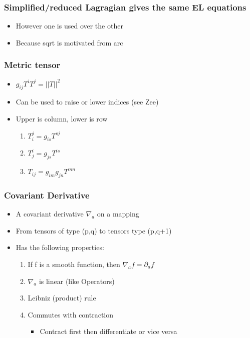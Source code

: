 \documentclass[11pt]{article}
\begin{document}
\subsubsection{Simplified/reduced Lagragian gives the same EL equations}
\label{sec:org6508df0}
\begin{itemize}
\item However one is used over the other
\item Because sqrt is motivated from arc
\end{itemize}
\subsubsection{Metric tensor}
\label{sec:orgf0d3028}
\begin{itemize}
\item \(g_{ij}T^iT^j = ||T||^2\)
\item Can be used to raise or lower indices (see Zee)
\item Upper is column, lower is row
\begin{enumerate}
\item \(T_i^j = g_{is}T^{sj}\)
\item \(T_j^i = g_{js}T^{is}\)
\item \(T_{ij} = g_{im}g_{jn}T^{mn}\)
\end{enumerate}
\end{itemize}
\subsubsection{Covariant Derivative}
\label{sec:orgcc46459}
\begin{itemize}
\item A covariant derivative \(\nabla_a\) on a mapping
\item From tensors of type (p,q) to tensors type (p,q+1)
\item Has the following properties:
\begin{enumerate}
\item If f is a smooth function, then \(\nabla_{a}f=\partial_{a}f\)
\item \(\nabla_a\) is linear (like Operators)
\item Leibniz (product) rule
\item Commutes with contraction
\begin{itemize}
\item Contract first then differentiate or vice versa
\end{itemize}
\end{enumerate}
\end{itemize}
\end{document}
